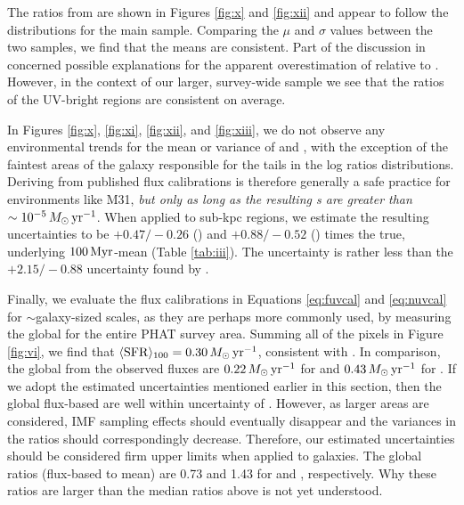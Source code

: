 \documentclass[iop, tighten]{emulateapj}
\begin{document}
The \fuv{} \sfr{} ratios from \citet{Simones:2014} are shown in Figures
\ref{fig:x} and \ref{fig:xii} and appear to follow the
distributions for the main sample. Comparing the $\mu$ and $\sigma$ values
between the two samples, we find that the means are consistent. Part of the
discussion in \citet{Simones:2014} concerned possible explanations for the
apparent overestimation of  relative to \sfroneh{}. However, in the
context of our larger, survey-wide sample we see that the \sfr{} ratios of the
UV-bright regions are consistent on average.

In Figures \ref{fig:x}, \ref{fig:xi}, \ref{fig:xii}, and \ref{fig:xiii}, we do
not observe any environmental trends for the mean or variance of \sfrx{} and
\sfrxz{}, with the exception of the faintest areas of the galaxy responsible for
the tails in the log \sfr{} ratios distributions. Deriving  from
published flux calibrations is therefore generally a safe practice for
environments like M31, \emph{but only as long as the resulting \sfr{}s are
greater than $\sim 10^{-5}\,M_\odot\,\mathrm{yr}^{-1}$}. When applied to sub-kpc regions, we
estimate the resulting uncertainties to be $+\!0.47/\!-\!0.26$ (\fuv{}) and
$+\!0.88/\!-\!0.52$ (\nuv{}) times the true, underlying $100\,\mathrm{Myr}$-mean \sfr{}
(Table \ref{tab:iii}). The \sfrfuv{} uncertainty is rather less than the
$+\!2.15/\!-\!0.88$ uncertainty found by \citet{Simones:2014}.

Finally, we evaluate the flux calibrations in Equations \ref{eq:fuvcal} and
\ref{eq:nuvcal} for $\sim$galaxy-sized scales, as they are perhaps more commonly
used, by measuring the global \sfr{} for the entire PHAT survey area. Summing
all of the pixels in Figure \ref{fig:vi}, we find that
$\langle\mathrm{SFR}\rangle_{100}=0.30\,M_\odot\,\mathrm{yr}^{-1}$, consistent with \citet{Lewis:2015}. In comparison,
the global  from the observed fluxes are $0.22\,M_\odot\,\mathrm{yr}^{-1}$ for \fuv{}
and $0.43\,M_\odot\,\mathrm{yr}^{-1}$ for \nuv{}. If we adopt the estimated uncertainties
mentioned earlier in this section, then the global flux-based  are well
within uncertainty of \sfroneh{}. However, as larger areas are considered, IMF
sampling effects should eventually disappear and the variances in the \sfr{}
ratios should correspondingly decrease. Therefore, our estimated uncertainties
should be considered firm upper limits when applied to galaxies. The global
\sfr{} ratios (flux-based to mean) are 0.73 and 1.43 for \fuv{} and \nuv{},
respectively. Why these ratios are larger than the median ratios above is not
yet understood.
\end{document}
